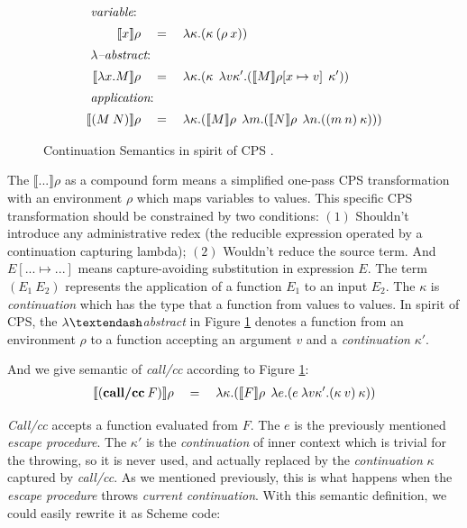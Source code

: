 \documentclass[numbers,numberedpars]{sigplanconf}
\begin{document}
\begin{figure}[tbph]
  \raggedright
  \begin{align*}
    \shortintertext{ {\it variable}: }
    \llbracket{x}\rrbracket\rho \quad&=\quad \lambda{\kappa}.(\kappa \: (\rho \: x))
    \\
    \shortintertext{ {\it $\lambda$\textendash abstract}: }
    \llbracket{\lambda{x}.M}\rrbracket\rho \quad&=\quad
    \lambda{\kappa}.(\kappa\:\:\lambda{v\kappa'}.(\llbracket{M}\rrbracket\rho[x \mapsto v]\:\:\kappa'))
    \\
    \shortintertext{ {\it application}: }
    \llbracket{(M\:N)}\rrbracket\rho \quad&=\quad
    \lambda{\kappa}.(\llbracket{M}\rrbracket\rho\:\:\lambda{m}.(\llbracket{N}\rrbracket\rho\:\:\lambda{n}.((m\:n)\:\kappa)))
  \end{align*}
  \caption{Continuation Semantics in spirit of CPS
    \citep{Danvy92representingcontrol:}\citep{Gasbichler:2002:FSC:581478.581504}.}
    \label{fig:cont_sema}
\end{figure}

The $\llbracket{...}\rrbracket\rho$ as a compound form means a simplified one-pass CPS transformation with an environment $\rho$
which maps variables to values. This specific CPS transformation should be constrained by two conditions:
$(1)$ Shouldn't introduce any administrative redex (the reducible expression operated by a continuation capturing lambda);
$(2)$ Wouldn't reduce the source term. And $E[...\mapsto...]$ means capture-avoiding substitution in expression $E$.
The term $(E_1\:E_2)$ represents the application of a function $E_1$ to an input $E_2$. The $\kappa$
is {\it continuation} which has the type that a function from values to values. In spirit of CPS,
the $\lambda\textendash${\it abstract} in Figure \ref{fig:cont_sema} denotes a function from an environment $\rho$ to a function
accepting an argument $v$ and a {\it continuation} $\kappa'$.

And we give semantic of {\it call/cc} according to Figure \ref{fig:cont_sema}:
\begin{align*}
  \llbracket{(\text{{\bf call/cc}}\:F)}\rrbracket\rho \quad=\quad
  \lambda{\kappa}.(\llbracket{F}\rrbracket\rho\:\: \lambda{e}.(e\: \lambda{v\kappa'}.(\kappa\:v)\: \kappa))
\end{align*}

{\it Call/cc} accepts a function evaluated from $F$. The $e$ is the previously mentioned {\it escape procedure}.
The $\kappa'$ is the {\it continuation} of inner context which is trivial for the throwing, so it is never used, and actually replaced
by the {\it continuation} $\kappa$ captured by {\it call/cc}. As we mentioned previously, this is what happens when the {\it escape procedure}
throws {\it current continuation}. With this semantic definition, we could easily rewrite it as Scheme code:
\end{document}

